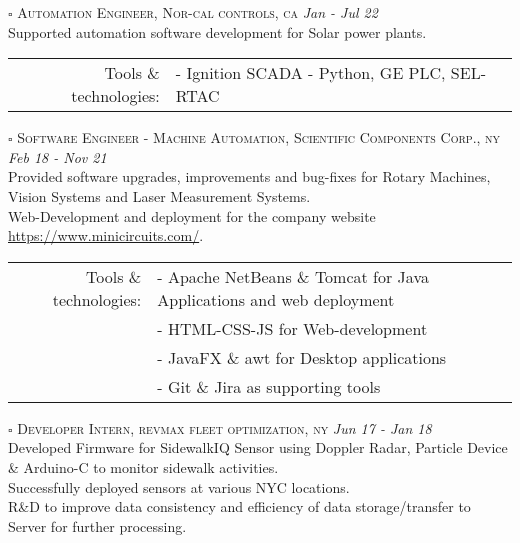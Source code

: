 \documentclass[a4paper]{article}
\begin{document}
	{ \textsc	{	$\square$	 Automation Engineer, Nor-cal controls, ca	}	}		\hfill { \emph {Jan - Jul 22 	} 	}	\\
	{			{	\textopenbullet	Supported automation software development for Solar power plants.						}	}	\\
\begin{tabular}{rl}
	{			{		Tools \& technologies:	} }	&	{	{	-	Ignition SCADA - Python, GE PLC, SEL-RTAC					}	}	\\
\end{tabular}
%
\begin{spacing}{1}
\end{spacing}
	{ \textsc	{	$\square$	 Software Engineer - Machine Automation, Scientific Components Corp., ny	}	}		\hfill { \emph {Feb 18 - Nov 21 		} 	}	\\
	{			{	\textopenbullet	Provided software upgrades, improvements and bug-fixes for Rotary Machines, Vision Systems and Laser Measurement Systems.	}	}	\\
	{			{	\textopenbullet	Web-Development and deployment for the company website \href{https://www.minicircuits.com/}{https://www.minicircuits.com/}.	}	}	\\
\begin{tabular}{rl}
	{			{		Tools \& technologies:	} }	&	{	{	-	Apache NetBeans \& Tomcat for Java Applications and web deployment					}	}	\\
													&	{	{	-	HTML-CSS-JS for Web-development 					}	}	\\
													&	{	{	-	JavaFX \& awt for Desktop applications 				}	}	\\
													&	{	{	-	Git \& Jira as supporting tools 					}	}	\\
\end{tabular}
%
\begin{spacing}{1}
\end{spacing}
	{ \textsc	{	$\square$	 Developer Intern, revmax fleet optimization, ny	}	}		\hfill { \emph {Jun 17 - Jan 18 		} 	}	\\
	{			{	\textopenbullet	Developed Firmware for SidewalkIQ Sensor using Doppler Radar, Particle Device \& Arduino-C to monitor sidewalk activities.	}	}	\\
	{			{	\textopenbullet	Successfully deployed sensors at various NYC locations.	}	}	\\
	{			{	\textopenbullet	R\&D to improve data consistency and efficiency of data storage/transfer to Server for further processing.	}	}	\\
%
\begin{spacing}{0.1}
\end{spacing}
\end{document}
